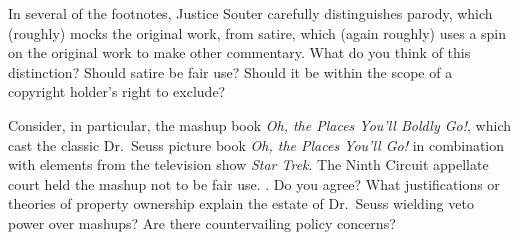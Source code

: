 \item In several of the footnotes, Justice Souter carefully distinguishes
parody, which (roughly) mocks the original work, from satire, which (again
roughly) uses a spin on the original work to make other commentary. What do you
think of this distinction? Should satire be fair use? Should it be within the
scope of a copyright holder's right to exclude?



Consider, in particular, the mashup book \emph{Oh, the Places You'll Boldly
Go!\@}, which cast the classic Dr.~Seuss picture book \emph{Oh, the Places
You'll Go!\@} in combination with elements from the television show \emph{Star
Trek}. The Ninth Circuit appellate court held the mashup not to be fair use.
. Do you agree? What justifications or
theories of property ownership explain the estate of Dr.~Seuss wielding veto
power over mashups? Are there countervailing policy concerns?

